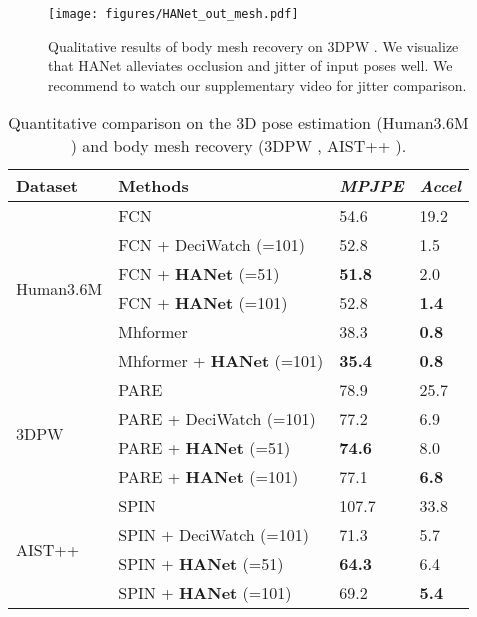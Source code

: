 \documentclass[10pt,twocolumn,letterpaper]{article}
\begin{document}
\begin{figure}[t]
\centering
\texttt{[image: figures/HANet\_out\_mesh.pdf]}
\caption{Qualitative results of body mesh recovery on 3DPW \cite{3dpw}. We visualize that HANet alleviates occlusion and jitter of input poses well. We recommend to watch our supplementary video for jitter comparison.}
\label{fig:body recovery}
\end{figure}

\begin{table*}[t]
\begin{center}
\begin{tabular}{l|l|ll} 
 \toprule
Dataset                                         & Methods             & \textit{MPJPE}            & \textit{Accel}     \\ \midrule
\multirow{6}{*}{Human3.6M \cite{h36m}}          & FCN \cite{fcn}      & 54.6            & 19.2          \\
                                                & FCN + DeciWatch \cite{deciwatch} (=101) & 52.8     & 1.5  \\
                                                & FCN + \textbf{HANet} (=51) & \textbf{51.8}        & 2.0          \\
                                                & FCN + \textbf{HANet} (=101) & 52.8        & \textbf{1.4}          \\
                                                & Mhformer \cite{li2022mhformer} & 38.3 & \textbf{0.8}\\
& Mhformer \cite{li2022mhformer} + \textbf{HANet} (=101) & \textbf{35.4} 
& \textbf{0.8} 
\\\midrule
\multirow{4}{*}{3DPW \cite{3dpw}}               & PARE \cite{pare}      & 78.9            & 25.7          \\
                                                & PARE + DeciWatch \cite{deciwatch} (=101) & 77.2     & 6.9  \\
                                                & PARE + \textbf{HANet} (=51) & \textbf{74.6}        & 8.0           \\
                                                & PARE + \textbf{HANet} (=101) & 77.1        & \textbf{6.8}           \\\midrule
\multirow{4}{*}{AIST++ \cite{aist}}             & SPIN \cite{spin} & 107.7              & 33.8          \\
                                                & SPIN + DeciWatch \cite{deciwatch} (=101) & 71.3     & 5.7  \\
                                                & SPIN + \textbf{HANet} (=51)  & \textbf{64.3}        & 6.4          \\
                                                & SPIN + \textbf{HANet} (=101) & 69.2        & \textbf{5.4}           \\ \bottomrule
\end{tabular}
\end{center}
\caption{Quantitative comparison on the 3D pose estimation (Human3.6M \cite{h36m}) and body mesh recovery (3DPW \cite{3dpw}, AIST++ \cite{aist}).}
\label{table:3d}
\end{table*}
\end{document}
